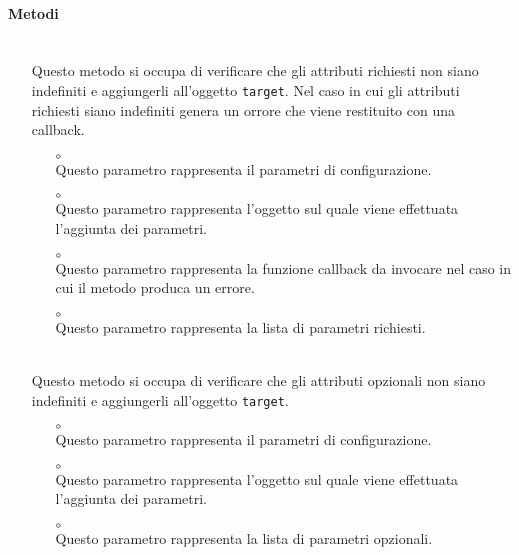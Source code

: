 \paragraph*{Metodi}
\begin{itemize}
\item[]  \\ Questo metodo si occupa di verificare che gli attributi richiesti non siano indefiniti e aggiungerli all'oggetto \texttt{target}. Nel caso in cui gli attributi richiesti siano indefiniti genera un orrore che viene restituito con una callback.
\begin{itemize}\addtolength{\itemsep}{-0.5\baselineskip}
\item[$\circ$]  \\ Questo parametro rappresenta il parametri di configurazione.
\item[$\circ$]  \\ Questo parametro rappresenta l'oggetto sul quale viene effettuata l'aggiunta dei parametri.
\item[$\circ$]  \\ Questo parametro rappresenta la funzione callback da invocare nel caso in cui il metodo produca un errore.
\item[$\circ$]  \\ Questo parametro rappresenta la lista di parametri richiesti.
\end{itemize}
\item[]  \\ Questo metodo si occupa di verificare che gli attributi opzionali non siano indefiniti e aggiungerli all'oggetto \texttt{target}.
\begin{itemize}\addtolength{\itemsep}{-0.5\baselineskip}
\item[$\circ$]  \\ Questo parametro rappresenta il parametri di configurazione.
\item[$\circ$]  \\ Questo parametro rappresenta l'oggetto sul quale viene effettuata l'aggiunta dei parametri.
\item[$\circ$]  \\ Questo parametro rappresenta la lista di parametri opzionali.

\end{itemize}
\end{itemize}
